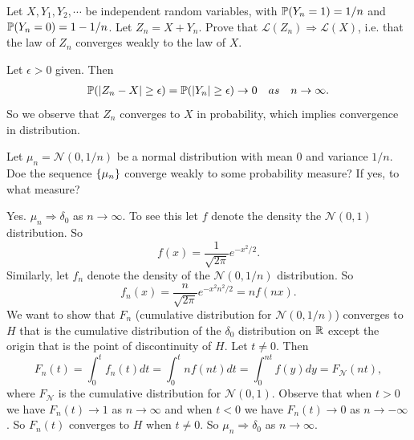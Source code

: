 \begin{problem}
	Let $ X,Y_1,Y_2,\cdots $ be independent random variables, with $ \mathbb{P}(Y_n=1)=1/n $ and $ \mathbb{P}(Y_n=0)=1-1/n $. Let $ Z_n = X + Y_n $. Prove that $ \mathcal{L}(Z_n)  \Rightarrow \mathcal{L}(X) $, i.e. that the law of $ Z_n $ converges weakly to the law of $ X $.
\end{problem}

\begin{solution}
	Let $ \epsilon>0 $ given. Then 
	\begin{align*}
		\mathbb{P}(|Z_n-X|\geq \epsilon) = \mathbb{P}(|Y_n|\geq \epsilon) \to 0 \quad as \quad n\to \infty.
	\end{align*}
	So we observe that $ Z_n $ converges to $ X $ in probability, which implies convergence in distribution.
\end{solution}

\begin{problem}
	Let $ \mu_n = \mathcal{N}(0,1/n) $ be a normal distribution with mean 0 and variance $ 1/n $.  Doe the sequence $ \{\mu_n\} $ converge weakly to some probability measure? If yes, to what measure?
\end{problem}
\begin{solution}
	Yes. $ \mu_n \Rightarrow \delta_0 $ as $ n\to\infty $. To see this let $ f $ denote the density the $ \mathcal{N}(0,1) $ distribution. So 
	\[ f(x) = \frac{1}{\sqrt{2\pi}}e^{-x^2/2}. \]
	Similarly, let $ f_n $ denote the density of the $ \mathcal{N}(0,1/n) $ distribution. So
	\[ f_n(x) = \frac{n}{\sqrt{2\pi}}e^{-x^2n^2/2} = nf(nx). \]
	We want to show that $ F_n $ (cumulative distribution for $ \mathcal{N}(0,1/n) $) converges to $ H $ that is the cumulative distribution of the $ \delta_0 $ distribution on $ \mathbb{R} $ except the origin that is the point of discontinuity of $ H $. Let $ t\neq 0 $. 
	Then 
	\[ F_n(t) = \int_{0}^{t}f_n(t)dt = \int_{0}^{t} nf(nt)dt = \int_{0}^{nt} f(y)dy = F_\mathcal{N}(nt), \]
	where $ F_\mathcal{N} $ is the cumulative distribution for $ \mathcal{N}(0,1) $. Observe that when $ t>0 $ we have $ F_n(t) \to 1 $ as $ n\to \infty $ and when $ t<0 $ we have $ F_n(t) \to 0 $ as $ n\to-\infty $. So $ F_n(t) $ converges to $ H $ when $ t\neq 0 $. So $ \mu_n \Rightarrow \delta_0 $ as $ n\to\infty $.
\end{solution}


